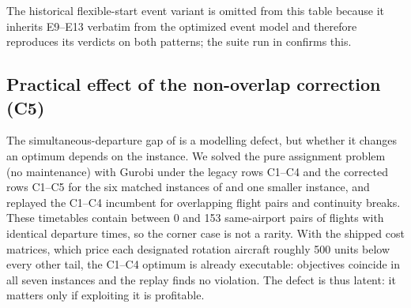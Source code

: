 \begin{table}[t]
\centering\small
\caption{Row-family numerical verification of conditional C13 and opening-hour
protection. The both-endpoints witness has $T^A_{\max}=600$ and
$\sum_{i\in F_{1,4}}x_{ij}\tilde t_i=1200$; the ending-only opening-gap
scenario uses a temporary transformed input with 610 minutes in the same
window. Both use $d_{\max}=4$. C13 status is row-local; opening status tests
companion C13b and independent replay. The event-state result is an E9--E13
fixed-schedule row check, not a full event-model solve.}
\label{tab:c13_loophole}
\end{table}

The historical flexible-start event variant is omitted from this table because it inherits
E9--E13 verbatim from the optimized event model and therefore reproduces its
verdicts on both patterns; the suite run in
 confirms this.

\subsection{Practical effect of the non-overlap correction (C5)}
\label{subsec:c5_impact}

The simultaneous-departure gap of  is a modelling defect, but
whether it changes an optimum depends on the instance. We solved the pure
assignment problem (no maintenance) with Gurobi under the legacy rows C1--C4
and the corrected rows C1--C5 for the six matched instances of
 and one smaller instance, and replayed the
C1--C4 incumbent for overlapping flight pairs and continuity breaks. These
timetables contain between 0 and 153 same-airport pairs of flights with
identical departure times, so the corner case is not a rarity. With the
shipped cost matrices, which price each designated rotation aircraft roughly
500 units below every other tail, the C1--C4 optimum is already executable:
objectives coincide in all seven instances and the replay finds no violation.
The defect is thus latent: it matters only if exploiting it is profitable.

